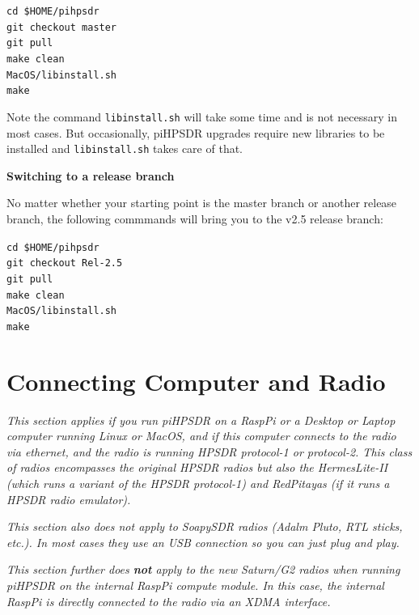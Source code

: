 \documentclass[12pt]{book}
\def\grtt#1{\texttt{\color{magenta}#1}}
\def\pH{pi\-HPSDR\xspace}
\begin{document}
\grtt{cd \$HOME/pihpsdr} \\
\grtt{git checkout master} \\
\grtt{git pull} \\
\grtt{make clean} \\
\grtt{MacOS/libinstall.sh} \\
\grtt{make}

Note the command \texttt{libinstall.sh} will take some time and is not necessary in most cases. But occasionally,
\pH upgrades require new libraries to be installed and \texttt{libinstall.sh} takes care of that.

\medskip
\textbf{Switching to a release branch}

No matter whether your starting point is the master branch or another release branch, the following
commmands will bring you to  the v2.5 release branch:

\grtt{cd \$HOME/pihpsdr} \\
\grtt{git checkout Rel-2.5} \\
\grtt{git pull} \\
\grtt{make clean} \\
\grtt{MacOS/libinstall.sh} \\
\grtt{make}

\chapter[Connecting the Computer and the Radio]{Connecting Computer and Radio}
\label{sec:dhcp}
\textit{This section applies if you run \pH on a
RaspPi or a Desktop or Laptop computer running Linux or MacOS, and if this computer connects to the
radio via ethernet, and the radio is running HPSDR protocol-1 or protocol-2. This class of radios
encompasses the original HPSDR radios but also the HermesLite-II (which runs a variant of the HPSDR
protocol-1) and RedPitayas (if it runs a HPSDR radio emulator).}

\textit{This section also does not apply to SoapySDR radios (Adalm Pluto, RTL sticks, etc.). In most
cases they use an USB connection so you can just plug and play.}

\textit{This section further does \textbf{not} apply to the new Saturn/G2 radios when running \pH on the
internal RaspPi compute module. In this case, the internal RaspPi
is directly connected to the radio via an XDMA interface.}
\end{document}
